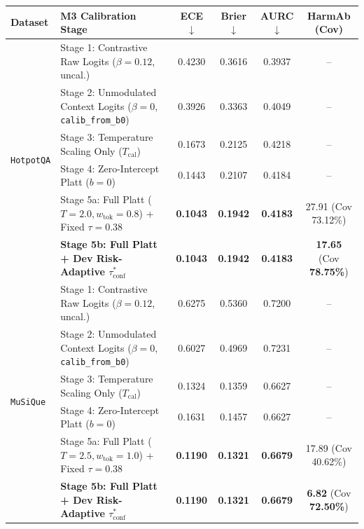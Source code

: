 \documentclass[11pt]{article}
\begin{document}
\begin{table}[t]
{\begin{tabular}{llcccc}
\midrule
\textbf{Dataset} & \textbf{M3 Calibration Stage} & \textbf{ECE} $\downarrow$ & \textbf{Brier} $\downarrow$ & \textbf{AURC} $\downarrow$ & \textbf{HarmAb (Cov)} \\
\midrule
\multirow{6}{*}{\texttt{HotpotQA}}
& Stage 1: Contrastive Raw Logits ($\beta=0.12$, uncal.) & 0.4230 & 0.3616 & 0.3937 & -- \\
& Stage 2: Unmodulated Context Logits ($\beta=0$, \texttt{calib\_from\_b0}) & 0.3926 & 0.3363 & 0.4049 & -- \\
& Stage 3: Temperature Scaling Only ($T_{\text{cal}}$) & 0.1673 & 0.2125 & 0.4218 & -- \\
& Stage 4: Zero-Intercept Platt ($b=0$) & 0.1443 & 0.2107 & 0.4184 & -- \\
& Stage 5a: Full Platt ($T=2.0, w_{\text{tok}}=0.8$) + Fixed $\tau=0.38$ & \textbf{0.1043} & \textbf{0.1942} & \textbf{0.4183} & 27.91 (Cov 73.12\%) \\
& \textbf{Stage 5b: Full Platt + Dev Risk-Adaptive $\tau_{\text{conf}}^*$} & \textbf{0.1043} & \textbf{0.1942} & \textbf{0.4183} & \textbf{17.65} (Cov \textbf{78.75\%}) \\
\midrule
\multirow{6}{*}{\texttt{MuSiQue}}
& Stage 1: Contrastive Raw Logits ($\beta=0.12$, uncal.) & 0.6275 & 0.5360 & 0.7200 & -- \\
& Stage 2: Unmodulated Context Logits ($\beta=0$, \texttt{calib\_from\_b0}) & 0.6027 & 0.4969 & 0.7231 & -- \\
& Stage 3: Temperature Scaling Only ($T_{\text{cal}}$) & 0.1324 & 0.1359 & 0.6627 & -- \\
& Stage 4: Zero-Intercept Platt ($b=0$) & 0.1631 & 0.1457 & 0.6627 & -- \\
& Stage 5a: Full Platt ($T=2.5, w_{\text{tok}}=1.0$) + Fixed $\tau=0.38$ & \textbf{0.1190} & \textbf{0.1321} & \textbf{0.6679} & 17.89 (Cov 40.62\%) \\
& \textbf{Stage 5b: Full Platt + Dev Risk-Adaptive $\tau_{\text{conf}}^*$} & \textbf{0.1190} & \textbf{0.1321} & \textbf{0.6679} & \textbf{6.82} (Cov \textbf{72.50\%}) \\
\bottomrule
\end{tabular}
}
\end{table}
\end{document}
